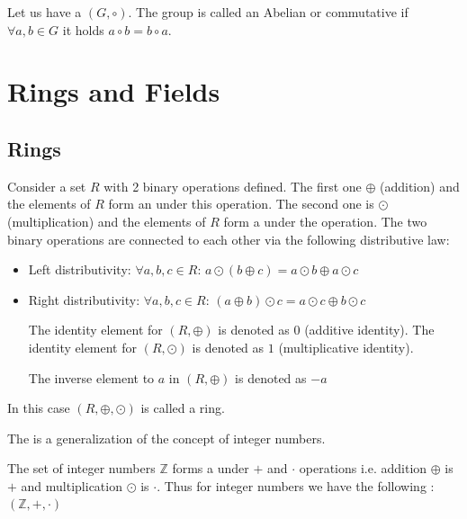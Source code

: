 \begin{appendices}
\begin{definition}
  Let us have a  $\left(G, \circ\right)$.
  The group is called an Abelian or commutative if
  $\forall a, b \in G$ it holds $a \circ b = b \circ a$.
  \label{def:abeliangroup}
\end{definition}


\section{Rings and Fields}

\subsection{Rings}

\begin{definition}[Ring]
  Consider a set $R$ with 2 binary operations defined. The first one
  $\oplus$ (addition) and the elements of $R$ form an
  under this operation. The second one is $\odot$ (multiplication) and
  the elements of $R$ form a  under 
  the operation. The two binary operations are connected to each other
  via the following distributive law:
  \begin{itemize}
  \item Left distributivity:
    $\forall a,b,c \in R$:
    $a \odot \left(b \oplus c\right) =
    a \odot b \oplus a \odot c$
  \item Right distributivity:
    $\forall a,b,c \in R$:
    $\left( a \oplus b \right) \odot c =
    a \odot c \oplus b \odot c$
    
  The identity element for $\left(R, \oplus\right)$ is denoted as $0$
  (additive identity).
  The identity element for $\left(R, \odot\right)$ is denoted as $1$
  (multiplicative identity).

  The inverse element to $a$ in $\left(R, \oplus\right)$ is denoted as $-a$
  \end{itemize}

  In this case $\left(R, \oplus, \odot\right)$ is called a ring.
  \label{def:ring}
\end{definition}

The  is a generalization of the concept of integer numbers.
\begin{example}
  The set of integer numbers $\mathbb{Z}$ forms a 
  under $+$ and $\cdot$ operations i.e. addition $\oplus$ is
  $+$ and multiplication $\odot$ is $\cdot$. Thus for integer
  numbers we have the following :
  $\left(\mathbb{Z}, +, \cdot\right)$
  \label{ex:ring}
\end{example}


\end{appendices}
